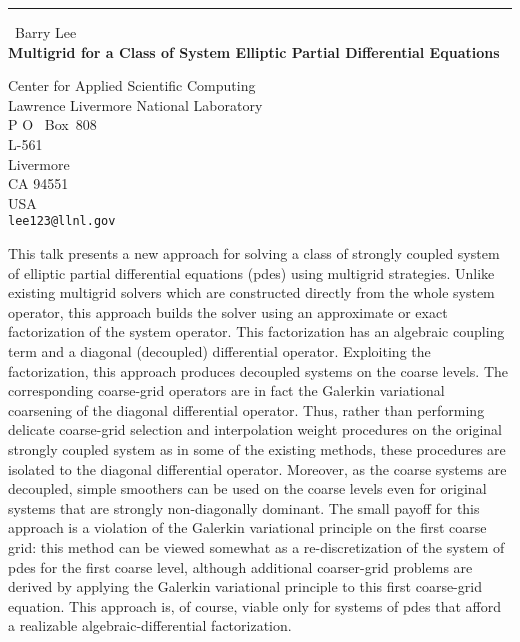 \documentclass{report}
\begin{document}
\begin{center}
\rule{6in}{1pt} \
{\large Barry Lee \\
{\bf Multigrid for a Class of System Elliptic Partial Differential Equations}}

Center for Applied Scientific Computing \\ Lawrence Livermore National Laboratory \\ P O ~Box~808 \\ L-561 \\ Livermore \\ CA 94551 \\ USA
\\
{\tt lee123@llnl.gov}\end{center}
%
%
This talk presents a new approach for solving a class of strongly coupled system of elliptic partial
differential equations (pdes) using multigrid strategies. Unlike existing
multigrid solvers which are constructed directly from the whole system
operator, this approach builds the solver using an approximate or exact factorization of the
system operator. This factorization has an algebraic coupling term and a diagonal 
(decoupled) differential operator. Exploiting the factorization,
this approach produces decoupled systems on the coarse levels. The corresponding coarse-grid
operators are in fact the Galerkin variational coarsening of the diagonal differential operator.
Thus, rather than performing delicate coarse-grid selection and interpolation weight procedures on the
original strongly coupled system as in some of the existing methods, these procedures are isolated 
to the diagonal differential operator. Moreover, as the coarse systems are decoupled,
simple smoothers can be used on the coarse levels even for original systems
that are strongly non-diagonally dominant. The small payoff for this approach is
a violation of the Galerkin variational principle on the first coarse grid:
this method can be viewed somewhat as a re-discretization of the system of
pdes for the first coarse level, although additional coarser-grid problems are derived
by applying the Galerkin variational principle to this first coarse-grid equation. This approach is, 
of course, viable only for systems of pdes that afford a realizable algebraic-differential factorization.
\end{document}
